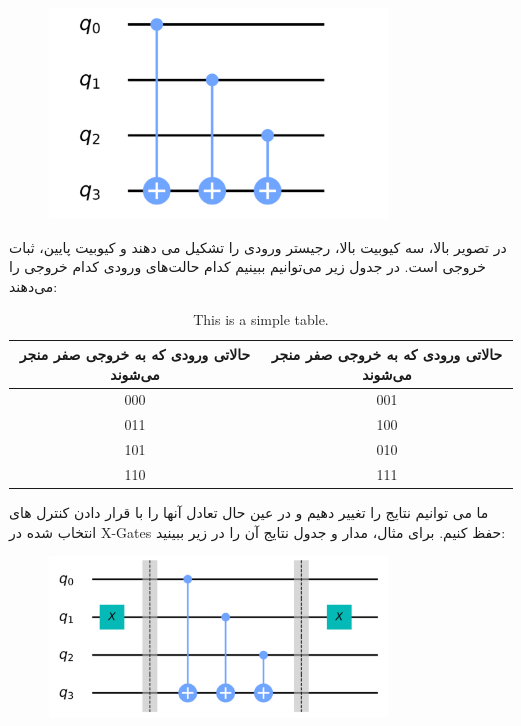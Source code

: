 \documentclass{book}
\begin{document}
\begin{center}
	\begin{figure}[ht]
		\centering
		\includegraphics[width=0.8\textwidth]{oraclecon.png}
		\caption{}
	\end{figure}
\end{center}




در تصویر بالا، سه کیوبیت بالا، رجیستر ورودی را تشکیل می دهند و کیوبیت پایین، ثبات خروجی است. در جدول زیر می‌توانیم ببینیم کدام حالت‌های ورودی کدام خروجی را می‌دهند:
\begin{table}[h]
	\centering
	\begin{tabular}{|c|c|}
		\hline
		حالاتی ورودی که به خروجی صفر منجر می‌شوند &  حالاتی ورودی که به خروجی صفر منجر می‌شوند \\ \hline
		000 & 001 \\ \hline
		011 & 100 \\ \hline
		101 & 010 \\ \hline
		110 & 111 \\ \hline
	\end{tabular}
	\caption{This is a simple table.}
\end{table}
ما می توانیم نتایج را تغییر دهیم و در عین حال تعادل آنها را با قرار دادن کنترل های انتخاب شده در X-Gates حفظ کنیم. برای مثال، مدار و جدول نتایج آن را در زیر ببینید:
\begin{center}
	\begin{figure}[ht]
		\centering
		\includegraphics[width=0.8\textwidth]{oraclebalance.png}
		\caption{}
	\end{figure}
\end{center}
\end{document}
